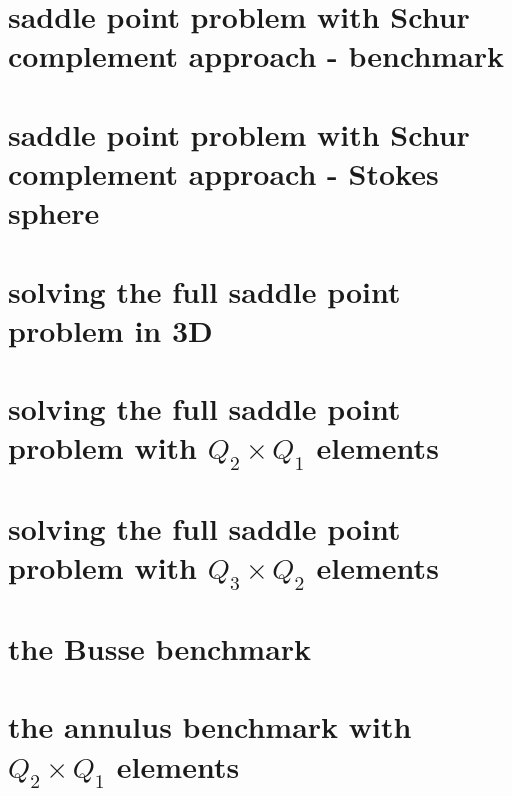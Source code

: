\documentclass[a4paper,11pt]{report}
\begin{document}
\chapter{saddle point problem with Schur complement approach - benchmark \label{f15}} %

\chapter{saddle point problem with Schur complement approach - Stokes sphere \label{f16}} %

\chapter{solving the full saddle point problem in 3D \label{f17}} %

\chapter{solving the full saddle point problem with $Q_2\times Q_1$ elements \label{f18}} %

\chapter{solving the full saddle point problem with $Q_3\times Q_2$ elements \label{f19}} %

\chapter{the Busse benchmark \label{f20}} %

\chapter{the annulus benchmark with $Q_2\times Q_1$ elements \label{f21}} %
\end{document}
